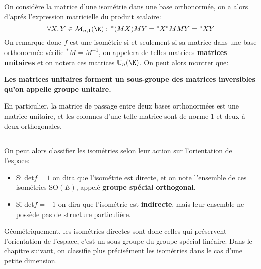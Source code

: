 \subsection*{}
On considère la matrice d'une isométrie dans une base orthonormée, on a alors d'aprés l'expression matricielle du produit scalaire:
\[
   \forall X, Y \in \mathcal{M}_{n, 1}(\K) \; ; \; {}^*(MX)MY = {}^*X{}^*MMY = {}^*XY  
\]
On remarque donc \(f\) est une isométrie si et seulement si sa matrice dans une base orthonormée vérifie \({}^*M = M^{-1}\), on appelera de telles matrices \textbf{matrices unitaires} et on notera ces matrices \(\mathbb{U}_n(\K)\). On peut alors montrer que:
\begin{center}
   \textbf{Les matrices unitaires forment un sous-groupe des matrices inversibles qu'on appelle groupe unitaire.}
\end{center}
En particulier, la matrice de passage entre deux bases orthonormées est une matrice unitaire, et les colonnes d'une telle matrice sont de norme \(1\) et deux à deux orthogonales.
\subsection*{}
On peut alors classifier les isométries selon leur action sur l'orientation de l'espace:
\begin{itemize}
   \item Si det\(f = 1\) on dira que l'isométrie est directe, et on note l'ensemble de ces isométries SO\((E)\), appelé \textbf{groupe spécial orthogonal}.
   \item Si det\(f = -1\) on dira que l'isométrie est \textbf{indirecte}, mais leur ensemble ne possède pas de structure particulière.
\end{itemize}
Géométriquement, les isométries directes sont donc celles qui préservent l'orientation de l'espace, c'est un sous-groupe du groupe spécial linéaire. Dans le chapitre suivant, on classifie plus précisément les isométries dans le cas d'une petite dimension.
\pagebreak
